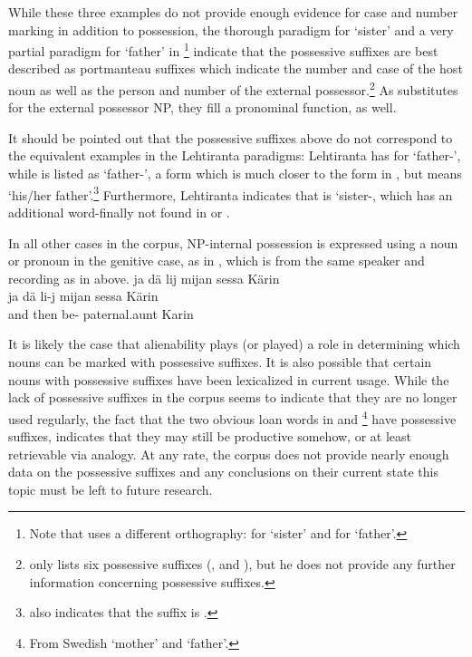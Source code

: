 While these three examples do not provide enough evidence for case and number marking in addition to possession, the thorough paradigm for  ‘sister’ and a very partial paradigm for  ‘father’ in \citet[158-159]{Lehtiranta1992}\footnote{Note that \citet{Lehtiranta1992} uses a different orthography:  for ‘sister’ and  for ‘father’.} indicate that the possessive suffixes are best described as portmanteau suffixes which indicate the number and case of the host noun as well as the person and number of the external possessor.\footnote{\citet[110]{Lagercrantz1926} only lists six possessive suffixes (,  and ), but he does not provide any further information concerning possessive suffixes.}
As substitutes for the external possessor NP, they fill a pronominal function, as well. %

It should be pointed out that the possessive suffixes above do not correspond to the equivalent examples in the Lehtiranta paradigms: Lehtiranta has  for ‘father-’, while  is listed as ‘father-’, a form which is much closer to the form in , but means ‘his/her father’.\footnote{\citet[110]{Lagercrantz1926} also indicates that the  suffix is .} 
Furthermore, Lehtiranta indicates that  is ‘sister-, which has an additional  word-finally not found in  or . 

In all other cases in the corpus, NP-internal possession is expressed using a noun or pronoun in the genitive case, as in , which is from the same speaker and recording as in  above.
\ea\label{noPossSuffix1}
\glll	ja dä lij mijan sessa Kärin\\
	ja dä li-j mijan sessa Kärin\\
	and then be-  paternal.aunt\BS{} Karin \\\nopagebreak
{}	
\z

It is likely the case that alienability plays (or played) a role in determining which nouns can be marked with possessive suffixes. It is also possible that certain nouns with possessive suffixes have been lexicalized in current usage. %
While the lack of possessive suffixes in the corpus seems to indicate that they are no longer used regularly, the fact that the two obvious loan words in  and \footnote{From Swedish  ‘mother’ and  ‘father’.} 
have possessive suffixes, indicates that they may still be productive somehow, or at least retrievable via analogy. At any rate, the corpus does not provide nearly enough data on the possessive suffixes and any conclusions on their current state this topic must be left to future research.


%
